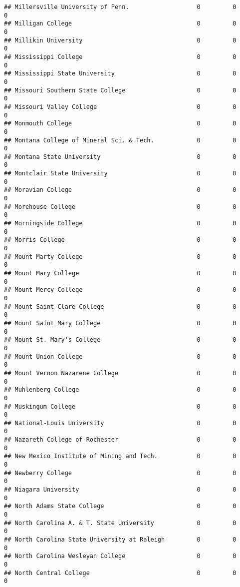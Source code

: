 \documentclass[
]{article}
\begin{document}
\begin{verbatim}
## Millersville University of Penn.                   0         0         0
## Milligan College                                   0         0         0
## Millikin University                                0         0         0
## Mississippi College                                0         0         0
## Mississippi State University                       0         0         0
## Missouri Southern State College                    0         0         0
## Missouri Valley College                            0         0         0
## Monmouth College                                   0         0         0
## Montana College of Mineral Sci. & Tech.            0         0         0
## Montana State University                           0         0         0
## Montclair State University                         0         0         0
## Moravian College                                   0         0         0
## Morehouse College                                  0         0         0
## Morningside College                                0         0         0
## Morris College                                     0         0         0
## Mount Marty College                                0         0         0
## Mount Mary College                                 0         0         0
## Mount Mercy College                                0         0         0
## Mount Saint Clare College                          0         0         0
## Mount Saint Mary College                           0         0         0
## Mount St. Mary's College                           0         0         0
## Mount Union College                                0         0         0
## Mount Vernon Nazarene College                      0         0         0
## Muhlenberg College                                 0         0         0
## Muskingum College                                  0         0         0
## National-Louis University                          0         0         0
## Nazareth College of Rochester                      0         0         0
## New Mexico Institute of Mining and Tech.           0         0         0
## Newberry College                                   0         0         0
## Niagara University                                 0         0         0
## North Adams State College                          0         0         0
## North Carolina A. & T. State University            0         0         0
## North Carolina State University at Raleigh         0         0         0
## North Carolina Wesleyan College                    0         0         0
## North Central College                              0         0         0

\end{verbatim}
\end{document}
